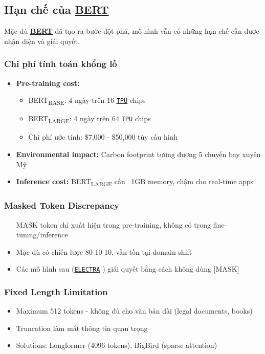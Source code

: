     \subsection{Hạn chế của \hyperref[acro:bert]{\textbf{BERT}}}
    \label{ssec:han_che_bert}
    
    Mặc dù \hyperref[acro:bert]{\textbf{BERT}} đã tạo ra bước đột phá, mô hình vẫn có những hạn chế cần được nhận diện và giải quyết.
    
    \subsubsection{Chi phí tính toán khổng lồ}
    \begin{itemize}
        \item \textbf{Pre-training cost:}
        \begin{itemize}
            \item BERT\textsubscript{BASE}: 4 ngày trên 16 \hyperref[acro:tpu]{\texttt{TPU}} chips \cite{devlin2018bert}
            \item BERT\textsubscript{LARGE}: 4 ngày trên 64 \hyperref[acro:tpu]{\texttt{TPU}} chips \cite{devlin2018bert}
            \item Chi phí ước tính: \$7,000 - \$50,000 tùy cấu hình
        \end{itemize}
        \item \textbf{Environmental impact:} Carbon footprint tương đương 5 chuyến bay xuyên Mỹ
        \item \textbf{Inference cost:} BERT\textsubscript{LARGE} cần ~1GB memory, chậm cho real-time apps
    \end{itemize}
    
    \subsubsection{Masked Token Discrepancy}
    \begin{itemize}
        \item [MASK] token chỉ xuất hiện trong pre-training, không có trong fine-tuning/inference
        \item Mặc dù có chiến lược 80-10-10, vẫn tồn tại domain shift
        \item Các mô hình sau (\hyperref[acro:electra]{\texttt{ELECTRA}} \cite{clark2020electra}) giải quyết bằng cách không dùng [MASK]
    \end{itemize}
    
    \subsubsection{Fixed Length Limitation}
    \begin{itemize}
        \item Maximum 512 tokens - không đủ cho văn bản dài (legal documents, books)
        \item Truncation làm mất thông tin quan trọng
        \item Solutions: Longformer \cite{beltagy2020longformer} (4096 tokens), BigBird (sparse attention)
    \end{itemize}
    
